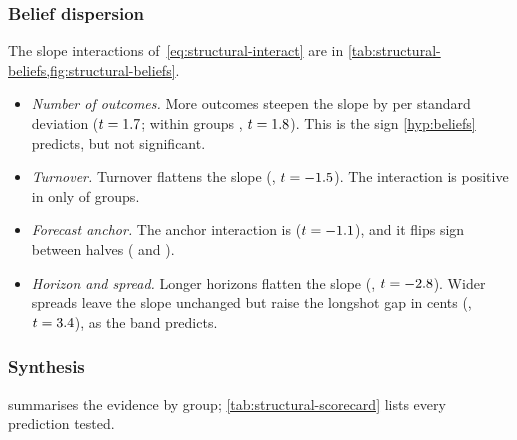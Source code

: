 \begin{table}[!htbp]
\begin{threeparttable}
\begin{tablenotes}
\end{tablenotes}
\end{threeparttable}
\end{table}

\subsubsection{Belief dispersion}\label{sec:res-structural-beliefs}

The slope interactions of~\eqref{eq:structural-interact} are in \cref{tab:structural-beliefs,fig:structural-beliefs}.
\begin{itemize}
  \item \emph{Number of outcomes.} More outcomes steepen the slope by \sdPoolLogOutcomes{} per standard deviation
  ($t=1.7$; within groups \sdWithinLogOutcomes, $t=1.8$). This is the sign
  \cref{hyp:beliefs} predicts, but not significant.
  \item \emph{Turnover.} Turnover flattens the slope (\sdPoolTurnover, $t=-1.5$). The interaction is
  positive in only \sdSignTurnoverPos{} of \sdSignTurnoverOf{} groups.
  \item \emph{Forecast anchor.} The anchor interaction is \sdPoolAnchored{} ($t=-1.1$), and it flips
  sign between halves (\sdHalfFirstAnchored{} and \sdHalfSecondAnchored).
  \item \emph{Horizon and spread.} Longer horizons flatten the slope (\sdPoolLogLead, $t=-2.8$). Wider
  spreads leave the slope unchanged but raise the longshot gap in cents (\sdLsWSpreadC, $t=3.4$), as the
  band predicts.
\end{itemize}

\subsubsection{Synthesis}\label{sec:res-structural-synthesis}

 summarises the evidence by group; \cref{tab:structural-scorecard} lists every
prediction tested.

